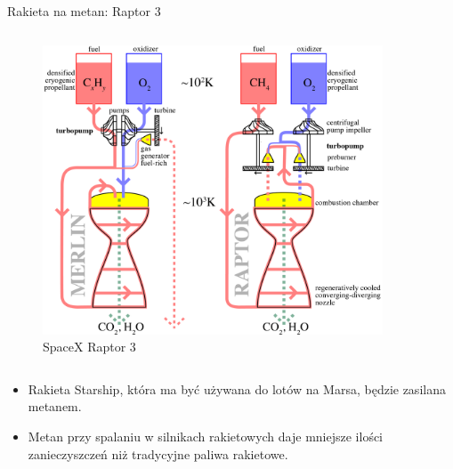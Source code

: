 \begin{columnframe}{Rakieta na metan: Raptor 3}
    \begin{column}{0.5\textwidth}
        \begin{figure}
            \centering
            \includegraphics[width=0.9\textwidth, frame]{images/Raptor3_Merlin_comparison.png}
            \caption{SpaceX Raptor 3}
        \end{figure}
    \end{column}
    \begin{column}{0.5\textwidth}
        \begin{itemize}
            \item Rakieta Starship, która ma być używana do lotów na Marsa, będzie zasilana metanem.
            \item Metan przy spalaniu w silnikach rakietowych daje mniejsze ilości zanieczyszczeń niż tradycyjne paliwa rakietowe.
        \end{itemize}
    \end{column}
\end{columnframe}

